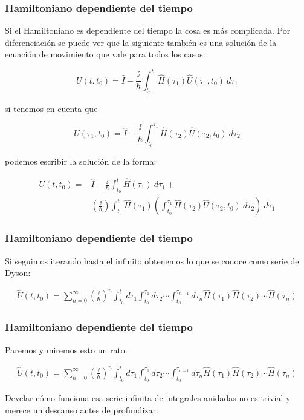 \documentclass{beamer}
\begin{document}
\begin{frame}
    \frametitle{Hamiltoniano dependiente del tiempo}

    Si el Hamiltoniano es dependiente del tiempo la cosa es más complicada. Por diferenciación se puede ver que la siguiente también es una solución de la ecuación de movimiento que vale para todos los casos:
    
    \[ U(t,t_0)= \hat{I}-\frac{\ii}{\hbar}\int_{t_0}^{t}\hat{H}(\tau_1)\hat{U}(\tau_1,t_0)\ d\tau_1 \]

    si tenemos en cuenta que 

    \[  U(\tau_1,t_0)= \hat{I}-\frac{\ii}{\hbar}\int_{t_0}^{\tau_1}\hat{H}(\tau_2)\hat{U}(\tau_2,t_0)\ d\tau_2 \]

    podemos escribir la solución de la forma:

    \begin{align*} 
        U(t,t_0)=&\hat{I}
    -\frac{\ii}{\hbar}\int_{t_0}^{t}\hat{H}(\tau_1)\ d\tau_1 + \\
    &\left(\frac{\ii}{\hbar}\right)\int_{t_0}^{t}\hat{H}(\tau_1)
    \left(
    \int_{t_0}^{\tau_1}\hat{H}(\tau_2)\hat{U}(\tau_2,t_0)\ d\tau_2
    \right)\ d\tau_1 
    \end{align*}

\end{frame}

\begin{frame}
    \frametitle{Hamiltoniano dependiente del tiempo}

    Si seguimos iterando hasta el infinito obtenemos lo que se conoce como serie de Dyson:

    \begin{align*} 
        \hat{U}(t,t_0)=
        \sum_{n=0}^\infty
        \left(\frac{\ii}{\hbar}\right)^n
        \int_{t_0}^{t}d\tau_{1}
        \int_{t_0}^{\tau_1}d\tau_2
        \cdots
        \int_{t_0}^{\tau_{n-1}}d\tau_n
        \hat{H}(\tau_1)\hat{H}(\tau_2)\cdots\hat{H}(\tau_n) 
    \end{align*}
\end{frame}

\begin{frame}
    \frametitle{Hamiltoniano dependiente del tiempo}

    Paremos y miremos esto un rato:

        \begin{align*} 
            \hat{U}(t,t_0)=
            \sum_{n=0}^\infty
            \left(\frac{\ii}{\hbar}\right)^n
            \int_{t_0}^{t}d\tau_{1}
            \int_{t_0}^{\tau_1}d\tau_2
            \cdots
            \int_{t_0}^{\tau_{n-1}}d\tau_n
            \hat{H}(\tau_1)\hat{H}(\tau_2)\cdots\hat{H}(\tau_n) 
        \end{align*}

    Develar cómo funciona esa serie infinita de integrales anidadas no es trivial y merece un
    descanso antes de profundizar.
\end{frame}
\end{document}
